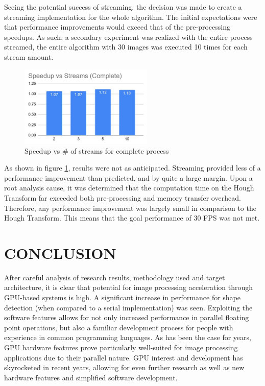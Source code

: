 \documentclass[12pt]{article}
\begin{document}
Seeing the potential success of streaming, the decision was made to create a streaming implementation for the whole algorithm. The initial expectations were that performance improvements would exceed that of the pre-processing speedups. As such, a secondary experiment was realized with the entire process streamed, the entire algorithm with 30 images was executed 10 times for each stream amount.

\begin{figure}
\centering
\includegraphics[width=2.5in]{figures/StreamsComplete}\caption{Speedup vs \# of streams for complete process}\label{figure:streamComplete}
\end{figure}

As shown in figure \ref{figure:streamComplete}, results were not as anticipated. Streaming provided less of a performance improvement than predicted, and by quite a large margin. Upon a root analysis cause, it was determined that the computation time on the Hough Transform far exceeded both pre-processing and memory transfer overhead. Therefore, any performance improvement was largely small in comparison to the Hough Transform. This means that the goal performance of 30 FPS was not met.

\section{\MakeUppercase{Conclusion}}

After careful analysis of research results, methodology used and target architecture, it is clear that potential for image processing acceleration through GPU-based systems is high. A significant increase in performance for shape detection (when compared to a serial implementation) was seen. Exploiting the software features allows for not only increased performance in parallel floating point operations, but also a familiar  development process for people with experience in common programming languages. As has been the case for years, GPU hardware features prove particularly well-suited for image processing applications due to their parallel nature. GPU interest and development has skyrocketed in recent years, allowing for even further research as well as new hardware features and simplified software development.
\end{document}
